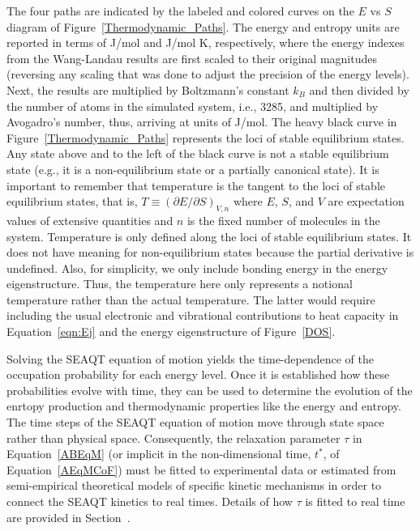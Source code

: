 \documentclass[
journal=jcisd8, %
manuscript=article,
layout=twocolumn   %
]{achemso}
\begin{document}
The four paths are indicated by the labeled and colored curves on the $E$ vs $S$ diagram of Figure~\ref{Thermodynamic_Paths}. The energy and entropy units are reported in terms of J/mol and J/mol K, respectively, where the energy indexes from the Wang-Landau results are first scaled to their original magnitudes (reversing any scaling that was done to adjust the precision of the energy levels). Next, the results are multiplied by Boltzmann's constant $k_B$ and then divided by the number of atoms in the simulated system, i.e., 3285, and multiplied by Avogadro's number, thus, arriving at units of J/mol. The heavy black curve in Figure~\ref{Thermodynamic_Paths} represents the loci of stable equilibrium states. Any state above and to the left of the black curve is not a stable equilibrium state (e.g., it is a non-equilibrium state or a partially canonical state). It is important to remember that temperature is the tangent to the loci of stable equilibrium states, that is, $T \equiv (\partial{E}/\partial{S})_{V,n}$ where $E$, $S$, and $V$ are expectation values of extensive quantities and $n$ is the fixed number of molecules in the system. Temperature is only defined along the loci of stable equilibrium states. It does not have meaning for non-equilibrium states because the partial derivative is undefined. Also, for simplicity, we only include bonding energy in the energy eigenstructure. Thus, the temperature here only represents a notional temperature rather than the actual temperature. The latter would require including the usual electronic and vibrational contributions to heat capacity in Equation~\ref{eqn:Ej} and the energy eigenstructure of Figure~\ref{DOS}.

Solving the SEAQT equation of motion yields the time-dependence of the occupation probability for each energy level. Once it is established how these probabilities evolve with time, they can be used to determine the evolution of the enrtopy production and  thermodynamic properties like the energy and entropy. The time steps of the SEAQT equation of motion move through state space rather than physical space. Consequently, the relaxation parameter $\tau$ in Equation~\ref{ABEqM} (or implicit in the non-dimensional time, $t^*$, of Equation~\ref{AEqMCoF}) must be fitted to experimental data or estimated from semi-empirical theoretical models of specific kinetic mechanisms in order to connect the SEAQT kinetics to real times. Details of how $\tau$ is fitted to real time are provided in Section~.
\end{document}
